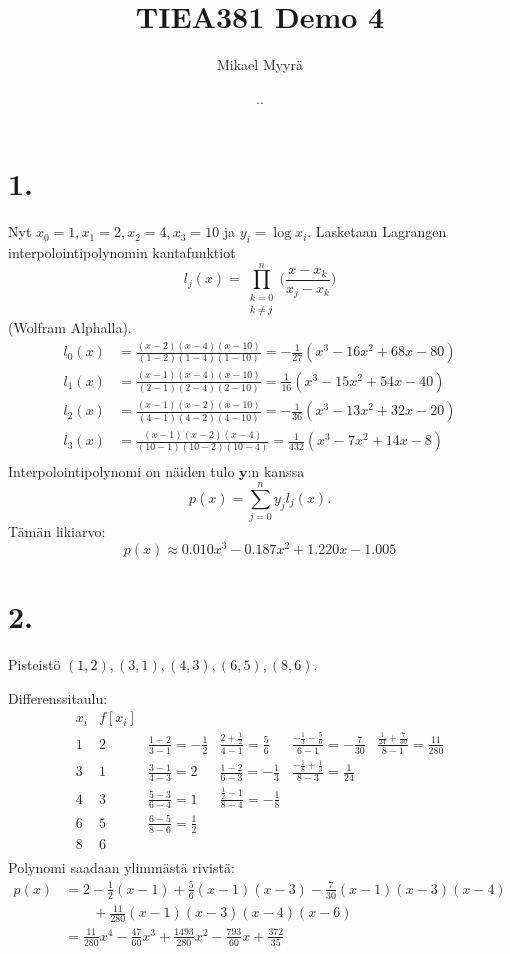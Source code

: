 \documentclass{article}
\title{TIEA381 Demo 4}
\author{Mikael Myyrä}
\date{\number\day.\number\month.\number\year}
\begin{document}
\maketitle

\section*{1.}

Nyt  $x_0 = 1, x_1 = 2, x_2 = 4, x_3 = 10$
ja $y_i = \log x_i$.
Lasketaan Lagrangen interpolointipolynomin kantafunktiot
\[
  l_j(x) = \prod_{\substack{k=0 \\ k \neq j}}^{n}
    \Big(\frac{x - x_k}{x_j - x_k}\Big)
\]
(Wolfram Alphalla).
\begin{align*}
  l_0(x) &= \frac{(x-2)(x-4)(x-10)}{(1-2)(1-4)(1-10)} = -\frac{1}{27}(x^3 - 16x^2 + 68x - 80) \\
  l_1(x) &= \frac{(x-1)(x-4)(x-10)}{(2-1)(2-4)(2-10)} = \frac{1}{16}(x^3 - 15x^2 + 54x - 40) \\
  l_2(x) &= \frac{(x-1)(x-2)(x-10)}{(4-1)(4-2)(4-10)} = -\frac{1}{36}(x^3 - 13x^2 + 32x - 20) \\
  l_3(x) &= \frac{(x-1)(x-2)(x-4)}{(10-1)(10-2)(10-4)} = \frac{1}{432}(x^3 - 7x^2 + 14x - 8) \\
\end{align*}
Interpolointipolynomi on näiden tulo $\mathbf{y}$:n kanssa
\[
  p(x) = \sum_{j=0}^{n} y_jl_j(x).
\]
Tämän likiarvo:
\[
  p(x) \approx 0.010x^3 - 0.187x^2 + 1.220x - 1.005
\]


\section*{2.}

Pisteistö $(1,2),(3,1),(4,3),(6,5),(8,6)$.

Differenssitaulu:
\[
  \begin{array}{c|ccccc}
    x_i & f[x_i] \\
    1 & 2 & \frac{1-2}{3-1} = -\frac{1}{2} & \frac{2+\frac{1}{2}}{4-1} = \frac{5}{6}
      & \frac{-\frac{1}{3}-\frac{5}{6}}{6-1} = -\frac{7}{30}
      & \frac{\frac{1}{24}+\frac{7}{30}}{8-1} = \frac{11}{280} \\
    3 & 1 & \frac{3-1}{4-3} = 2 & \frac{1-2}{6-3} = -\frac{1}{3} 
      & \frac{-\frac{1}{8}+\frac{1}{3}}{8-3} = \frac{1}{24} \\
    4 & 3 & \frac{5-3}{6-4} = 1 & \frac{\frac{1}{2}-1}{8-4} = -\frac{1}{8} \\
    6 & 5 & \frac{6-5}{8-6} = \frac{1}{2} \\
    8 & 6 \\
  \end{array}
\]
Polynomi saadaan ylimmästä rivistä:
\begin{align*}
  p(x) &= 2 - \frac{1}{2}(x-1) + \frac{5}{6}(x-1)(x-3)
    - \frac{7}{30}(x-1)(x-3)(x-4) \\
       & \qquad + \frac{11}{280}(x-1)(x-3)(x-4)(x-6) \\
       &= \frac{11}{280}x^4 - \frac{47}{60}x^3 
       + \frac{1493}{280}x^2 - \frac{793}{60}x + \frac{372}{35} \\
\end{align*}
\end{document}
